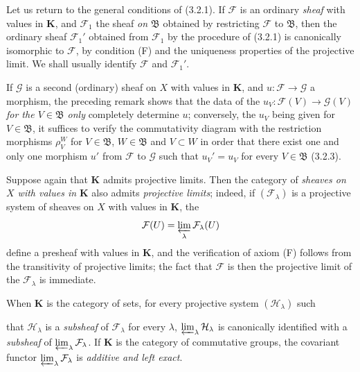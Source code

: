 \begin{env}[3.2.5]
\label{0.3.2.5}
Let us return to the general conditions of (3.2.1). If $\mathcal{F}$ is an
ordinary \emph{sheaf} with values in $\mathbf{K}$, and $\mathcal{F}_1$ the
sheaf \emph{on $\mathfrak{B}$} obtained by restricting $\mathcal{F}$ to
$\mathfrak{B}$, then the ordinary sheaf $\mathcal{F}_1'$ obtained from
$\mathcal{F}_1$ by the procedure of (3.2.1) is canonically isomorphic to
$\mathcal{F}$, by condition (F) and the uniqueness properties of the
projective limit. We shall usually identify $\mathcal{F}$ and
$\mathcal{F}_1'$.

If $\mathcal{G}$ is a second (ordinary) sheaf on $X$ with values in
$\mathbf{K}$, and $u:\mathcal{F}\to\mathcal{G}$ a morphism, the preceding
remark shows that the data of the
$u_V:\mathcal{F}(V)\to\mathcal{G}(V)$ \emph{for the $V\in\mathfrak{B}$
only} completely determine $u$; conversely, the $u_V$
being given for $V\in\mathfrak{B}$, it suffices to verify the commutativity diagram
with the restriction morphisms $\rho_V^W$ for $V\in\mathfrak{B}$,
$W\in\mathfrak{B}$ and $V\subset W$ in order that there exist one and only one
morphism $u'$ from $\mathcal{F}$ to $\mathcal{G}$ such that $u_V'=u_V$ for every
$V\in\mathfrak{B}$ (3.2.3).
\end{env}

\begin{env}[3.2.6]
\label{0.3.2.6}
Suppose again that $\mathbf{K}$ admits projective limits. Then the
category of \emph{sheaves on $X$ with values in $\mathbf{K}$} also admits
\emph{projective limits}; indeed, if $(\mathcal{F}_\lambda)$ is a
projective system of sheaves on $X$ with values in $\mathbf{K}$, the
\[
  \mathcal{F}(U)=\varprojlim_\lambda\mathcal{F}_\lambda(U)
\]
define a presheaf with values in $\mathbf{K}$, and the
verification of axiom (F) follows from the transitivity of projective
limits; the fact that $\mathcal{F}$ is then the projective limit of the
$\mathcal{F}_\lambda$ is immediate.

When $\mathbf{K}$ is the category of sets, for every
projective system $(\mathcal{H}_\lambda)$ such


that $\mathcal{H}_\lambda$ is a \emph{subsheaf} of
$\mathcal{F}_\lambda$ for every $\lambda$,
$\varprojlim_\lambda\mathcal{H}_\lambda$ is canonically identified with a
\emph{subsheaf} of $\varprojlim_\lambda\mathcal{F}_\lambda$. If
$\mathbf{K}$ is the category of commutative groups, the covariant functor
$\varprojlim_\lambda\mathcal{F}_\lambda$ is \emph{additive and left exact}.
\end{env}

